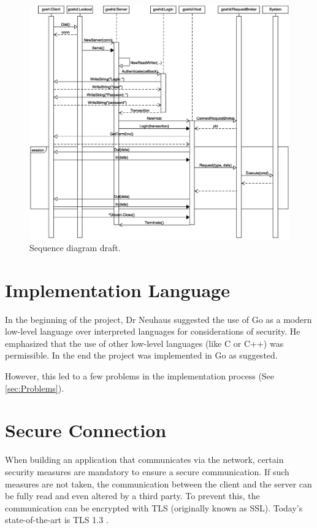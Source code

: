 \documentclass[10pt,a4paper,titlepage,twoside,english,final]{zhawreprt}
\begin{document}
\begin{figure}[ht]
\includegraphics[width=\textwidth]{SequenceDiagram}
\caption{Sequence diagram draft.}
\label{fig:SeqDiaOriginal}
\end{figure}


\section{Implementation Language}\label{sec:DesignImplementationLanguage}
In the beginning of the project, Dr Neuhaus suggested the use of \gls{Go} as a modern low-level language over interpreted languages for considerations of security.
He emphasized that the use of other low-level languages (like \gls{C} or \gls{C++}) was permissible.
In the end the project was implemented in \gls{Go} as suggested.

However, this led to a few problems in the implementation process (See \ref{sec:Problems}).

\section{Secure Connection}\label{sec:DesignSecureConnection}
When building an application that communicates via the network, certain security measures are mandatory to ensure a secure communication.
If such measures are not taken, the communication between the client and the server can be fully read and even altered by a third party.
To prevent this, the communication can be encrypted with \gls{TLS} (originally known as \gls{SSL}).
Today's state-of-the-art is \gls{TLS} 1.3 \citep{rfc8446}.
\end{document}

